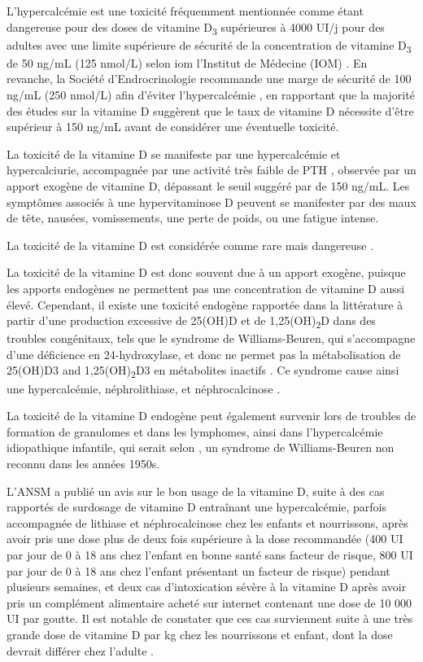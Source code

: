 \documentclass[
  a4paper,
  DIV=11,
  numbers=noendperiod,
  listof=totoc]{scrreprt}
\begin{document}
L'hypercalcémie est une toxicité fréquemment mentionnée comme étant
dangereuse pour des doses de vitamine D\textsubscript{3} supérieures à
4000 UI/j pour des adultes avec une limite supérieure de sécurité de la
concentration de vitamine D\textsubscript{3} de 50 ng/mL (125 nmol/L)
selon \ac{iom} l'Institut de Médecine (IOM)
\autocites[pp.~9-10]{IOM.2011.org}{Holick.2011}. En revanche, la Société
d'Endrocrinologie recommande une marge de sécurité de 100 ng/mL (250
nmol/L) afin d'éviter l'hypercalcémie \autocite{Holick.2011}, en
rapportant que la majorité des études sur la vitamine D suggèrent que le
taux de vitamine D nécessite d'être supérieur à 150 ng/mL avant de
considérer une éventuelle toxicité.

La toxicité de la vitamine D se manifeste par une hypercalcémie et
hypercalciurie, accompagnée par une activité très faible de PTH
\autocite{Marcinowska-Suchowierska.2018}, observée par un apport exogène
de vitamine D, dépassant le seuil suggéré par \textcite{Holick.2011} de
150 ng/mL. Les symptômes associés à une hypervitaminose D peuvent se
manifester par des maux de tête, nausées, vomissements, une perte de
poids, ou une fatigue intense.

La toxicité de la vitamine D est considérée comme rare mais dangereuse
\autocite{Marcinowska-Suchowierska.2018,Holick.2015}.

La toxicité de la vitamine D est donc souvent due à un apport exogène,
puisque les apports endogènes ne permettent pas une concentration de
vitamine D aussi élevé. Cependant, il existe une toxicité endogène
rapportée dans la littérature à partir d'une production excessive de
25(OH)D et de 1,25(OH)\textsubscript{2}D dans des troubles congénitaux,
tels que le syndrome de Williams-Beuren, qui s'accompagne d'une
déficience en 24-hydroxylase, et donc ne permet pas la métabolisation de
25(OH)D3 and 1,25(OH)\textsubscript{2}D3 en métabolites inactifs
\autocite{Marcinowska-Suchowierska.2018,Holick.2015}. Ce syndrome cause
ainsi une hypercalcémie, néphrolithiase, et néphrocalcinose
\autocite{Azer.2021}.

La toxicité de la vitamine D endogène peut également survenir lors de
troubles de formation de granulomes et dans les lymphomes, ainsi dans
l'hypercalcémie idiopathique infantile, qui serait selon
\textcite{Holick.2015}, un syndrome de Williams-Beuren non reconnu dans
les années 1950s.

L'ANSM a publié un avis sur le bon usage de la vitamine D, suite à des
cas rapportés de surdosage de vitamine D entraînant une hypercalcémie,
parfois accompagnée de lithiase et néphrocalcinose chez les enfants et
nourrissons, après avoir pris une dose plus de deux fois supérieure à la
dose recommandée (400 UI par jour de 0 à 18 ans chez l'enfant en bonne
santé sans facteur de risque, 800 UI par jour de 0 à 18 ans chez
l'enfant présentant un facteur de risque) pendant plusieurs semaines, et
deux cas d'intoxication sévère à la vitamine D après avoir pris un
complément alimentaire acheté sur internet contenant une dose de 10 000
UI par goutte. Il est notable de constater que ces cas surviennent suite
à une très grande dose de vitamine D par kg chez les nourrissons et
enfant, dont la dose devrait différer chez l'adulte
\autocite{ANSM.2021}.
\end{document}
